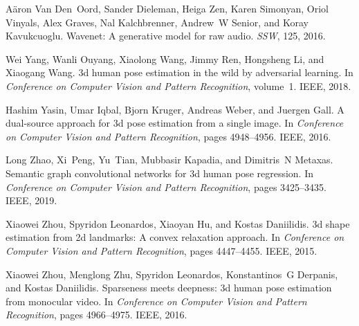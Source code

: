 \documentclass{bmvc2k}
\begin{document}
\begin{thebibliography}{42}
A{\"a}ron Van Den~Oord, Sander Dieleman, Heiga Zen, Karen Simonyan, Oriol
  Vinyals, Alex Graves, Nal Kalchbrenner, Andrew~W Senior, and Koray
  Kavukcuoglu.
\newblock Wavenet: A generative model for raw audio.
\newblock \emph{SSW}, 125, 2016.

Wei Yang, Wanli Ouyang, Xiaolong Wang, Jimmy Ren, Hongsheng Li, and Xiaogang
  Wang.
\newblock 3d human pose estimation in the wild by adversarial learning.
\newblock In \emph{Conference on Computer Vision and Pattern Recognition},
  volume~1. IEEE, 2018.

Hashim Yasin, Umar Iqbal, Bjorn Kruger, Andreas Weber, and Juergen Gall.
\newblock A dual-source approach for 3d pose estimation from a single image.
\newblock In \emph{Conference on Computer Vision and Pattern Recognition},
  pages 4948--4956. IEEE, 2016.

Long Zhao, Xi~Peng, Yu~Tian, Mubbasir Kapadia, and Dimitris~N Metaxas.
\newblock Semantic graph convolutional networks for 3d human pose regression.
\newblock In \emph{Conference on Computer Vision and Pattern Recognition},
  pages 3425--3435. IEEE, 2019.

Xiaowei Zhou, Spyridon Leonardos, Xiaoyan Hu, and Kostas Daniilidis.
\newblock 3d shape estimation from 2d landmarks: A convex relaxation approach.
\newblock In \emph{Conference on Computer Vision and Pattern Recognition},
  pages 4447--4455. IEEE, 2015.

Xiaowei Zhou, Menglong Zhu, Spyridon Leonardos, Konstantinos~G Derpanis, and
  Kostas Daniilidis.
\newblock Sparseness meets deepness: 3d human pose estimation from monocular
  video.
\newblock In \emph{Conference on Computer Vision and Pattern Recognition},
  pages 4966--4975. IEEE, 2016.

\end{thebibliography}
 
\end{document}
